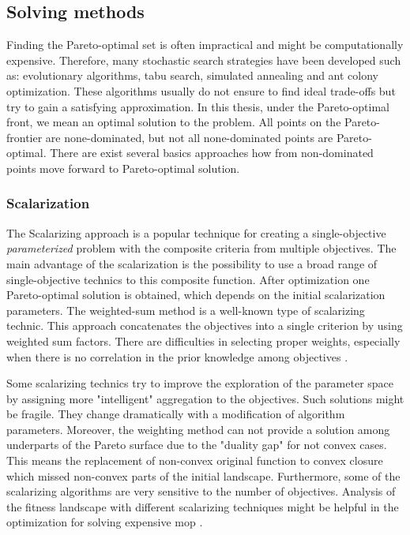         \subsection{Solving methods}
            Finding the Pareto-optimal set is often impractical and might be computationally expensive. Therefore, many stochastic search strategies have been developed such as: evolutionary algorithms, tabu search, simulated annealing and ant colony optimization. These algorithms usually do not ensure to find ideal trade-offs but try to gain a satisfying approximation.
            In this thesis, under the Pareto-optimal front, we mean an optimal solution to the problem. All points on the Pareto-frontier are none-dominated, but not all none-dominated points are Pareto-optimal. There are exist several basics approaches how from non-dominated points move forward to Pareto-optimal solution.
        
            \subsubsection{Scalarization}
                The Scalarizing approach is a popular technique for creating a single-objective \textit{parameterized} problem with the composite criteria from multiple objectives. The main advantage of the scalarization is the possibility to use a broad range of single-objective technics to this composite function. After optimization one Pareto-optimal solution is obtained, which depends on the initial scalarization parameters. The weighted-sum method is a well-known type of scalarizing technic. This approach concatenates the objectives into a single criterion by using weighted sum factors. There are difficulties in selecting proper weights, especially when there is no correlation in the prior knowledge among objectives \cite{ChughScal2019, DerbelBLV14}. 

                Some scalarizing technics try to improve the exploration of the parameter space by assigning more "intelligent" aggregation to the objectives. Such solutions might be fragile. They change dramatically with a modification of algorithm parameters. Moreover, the weighting method can not provide a solution among underparts of the Pareto surface due to the "duality gap" for not convex cases. This means the replacement of non-convex original function to convex closure which missed non-convex parts of the initial landscape. Furthermore, some of the scalarizing algorithms are very sensitive to the number of objectives. Analysis of the fitness landscape with different scalarizing techniques might be helpful in the optimization for solving expensive \gls{mop} \cite{ChughScal2019}.


